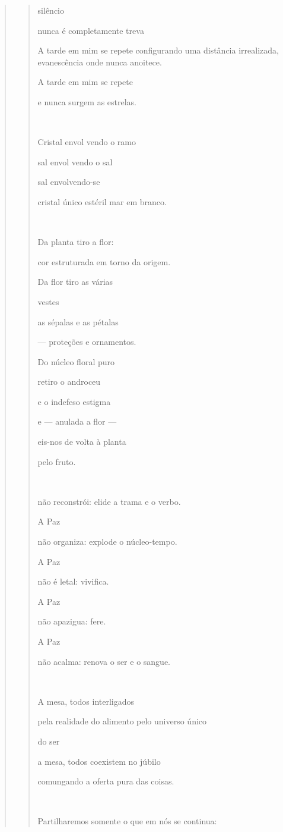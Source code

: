 \begin{verse}
\begin{quote}
silêncio

nunca é completamente treva

A tarde em mim se repete configurando uma distância irrealizada,
evanescência onde nunca anoitece.

A tarde em mim se repete

e nunca surgem as estrelas.



Cristal envol vendo o ramo

sal envol vendo o sal

sal envolvendo-se

cristal único estéril mar em branco.



Da planta tiro a flor:

cor estruturada em torno da origem.

Da flor tiro as várias

vestes

as sépalas e as pétalas

--- proteções e ornamentos.

Do núcleo floral puro

retiro o androceu

e o indefeso estigma

e --- anulada a flor ---

eis-nos de volta à planta

pelo fruto.

 

não reconstrói: elide a trama e o verbo.

A Paz

não organiza: explode o núcleo-tempo.

A Paz

não é letal: vivifica.

A Paz

não apazigua: fere.

A Paz

não acalma: renova o ser e o sangue.



A mesa, todos interligados

pela realidade do alimento pelo universo único

do ser

a mesa, todos coexistem no júbilo

comungando a oferta pura das coisas.



Partilharemos somente o que em nós se continua:


\end{quote}
\end{verse}

